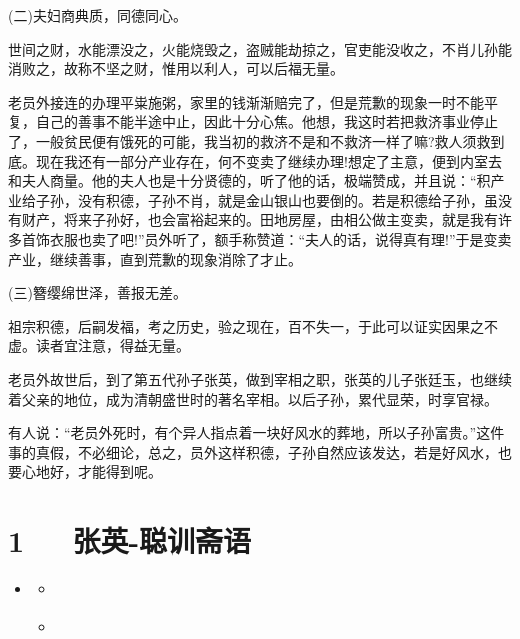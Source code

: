 \documentclass[letterpaper,12pt,english]{sphinxmanual}
\begin{document}
(二)夫妇商典质，同德同心。

世间之财，水能漂没之，火能烧毁之，盗贼能劫掠之，官吏能没收之，不肖儿孙能消败之，故称不坚之财，惟用以利人，可以后福无量。

老员外接连的办理平粜施粥，家里的钱渐渐赔完了，但是荒歉的现象一时不能平复，自己的善事不能半途中止，因此十分心焦。他想，我这时若把救济事业停止了，一般贫民便有饿死的可能，我当初的救济不是和不救济一样了嘛?救人须救到底。现在我还有一部分产业存在，何不变卖了继续办理!想定了主意，便到内室去和夫人商量。他的夫人也是十分贤德的，听了他的话，极端赞成，并且说：“积产业给子孙，没有积德，子孙不肖，就是金山银山也要倒的。若是积德给子孙，虽没有财产，将来子孙好，也会富裕起来的。田地房屋，由相公做主变卖，就是我有许多首饰衣服也卖了吧!”员外听了，额手称赞道：“夫人的话，说得真有理!”于是变卖产业，继续善事，直到荒歉的现象消除了才止。

(三)簪缨绵世泽，善报无差。

祖宗积德，后嗣发福，考之历史，验之现在，百不失一，于此可以证实因果之不虚。读者宜注意，得益无量。

老员外故世后，到了第五代孙子张英，做到宰相之职，张英的儿子张廷玉，也继续着父亲的地位，成为清朝盛世时的著名宰相。以后子孙，累代显荣，时享官禄。

有人说：“老员外死时，有个异人指点着一块好风水的葬地，所以子孙富贵。”这件事的真假，不必细论，总之，员外这样积德，子孙自然应该发达，若是好风水，也要心地好，才能得到呢。


\chapter{1   张英-聪训斋语}
\label{\detokenize{p00_u5176_u5b83/_u5f20_u82f1-_u806a_u8bad_u658b_u8bed:id1}}\label{\detokenize{p00_u5176_u5b83/_u5f20_u82f1-_u806a_u8bad_u658b_u8bed::doc}}
\begin{sphinxShadowBox}
\begin{itemize}
\item {} 
\label{\detokenize{p00_u5176_u5b83/_u5f20_u82f1-_u806a_u8bad_u658b_u8bed:id5}}{\hyperref[\detokenize{p00_u5176_u5b83/_u5f20_u82f1-_u806a_u8bad_u658b_u8bed:id1}]{}}
\begin{itemize}
\item {} 
\label{\detokenize{p00_u5176_u5b83/_u5f20_u82f1-_u806a_u8bad_u658b_u8bed:id6}}{\hyperref[\detokenize{p00_u5176_u5b83/_u5f20_u82f1-_u806a_u8bad_u658b_u8bed:id3}]{}}

\item {} 
\label{\detokenize{p00_u5176_u5b83/_u5f20_u82f1-_u806a_u8bad_u658b_u8bed:id7}}{\hyperref[\detokenize{p00_u5176_u5b83/_u5f20_u82f1-_u806a_u8bad_u658b_u8bed:id4}]{}}

\end{itemize}

\end{itemize}
\end{sphinxShadowBox}
\end{document}

